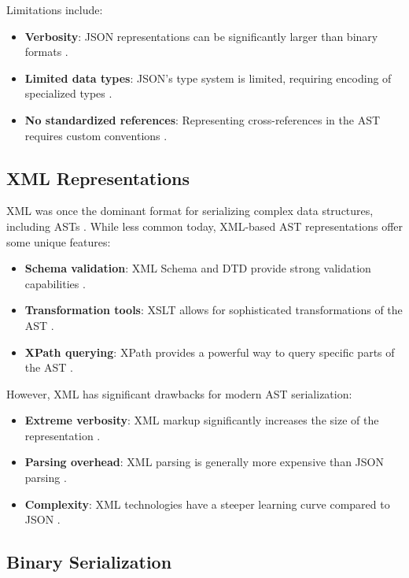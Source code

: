 Limitations include:
\begin{itemize}
    \item \textbf{Verbosity}: JSON representations can be significantly larger than binary formats \cite{bray2017json}.
    \item \textbf{Limited data types}: JSON's type system is limited, requiring encoding of specialized types \cite{crockford2006json}.
    \item \textbf{No standardized references}: Representing cross-references in the AST requires custom conventions \cite{bray2017json}.
\end{itemize}

\subsection{XML Representations}

XML was once the dominant format for serializing complex data structures, including ASTs \cite{bray1997extensible}. While less common today, XML-based AST representations offer some unique features:

\begin{itemize}
    \item \textbf{Schema validation}: XML Schema and DTD provide strong validation capabilities \cite{bray1997extensible}.
    \item \textbf{Transformation tools}: XSLT allows for sophisticated transformations of the AST \cite{kay2000xslt}.
    \item \textbf{XPath querying}: XPath provides a powerful way to query specific parts of the AST \cite{clark1999xml}.
\end{itemize}

However, XML has significant drawbacks for modern AST serialization:
\begin{itemize}
    \item \textbf{Extreme verbosity}: XML markup significantly increases the size of the representation \cite{bray1997extensible}.
    \item \textbf{Parsing overhead}: XML parsing is generally more expensive than JSON parsing \cite{nurseitov2009comparison}.
    \item \textbf{Complexity}: XML technologies have a steeper learning curve compared to JSON \cite{nurseitov2009comparison}.
\end{itemize}

\subsection{Binary Serialization}


